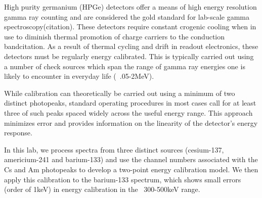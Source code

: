 High purity germanium (HPGe) detectors offer a means of high energy resolution gamma
ray counting and are considered the gold standard for lab-scale gamma
spectroscopy(citation). These detectors require constant crogenic cooling when in use to
diminish thermal promotion of charge carriers to the conduction band{citation}. As a
result of thermal cycling and drift in readout electronics, these detectors must
be regularly energy calibrated. This is typically carried out using a number of
check sources which span the range of gamma ray energies one is likely to encounter
in everyday life (~.05-2MeV). \par
While calibration can theoretically be carried out using a minimum of two distinct
photopeaks, standard operating procedures in most cases call for at least three
of such peaks spaced widely across the useful energy range. This approach minimizes
error and provides information on the linearity of the detector's energy response. \par
In this lab, we process spectra from three distinct sources (cesium-137, americium-241
and barium-133) and use the channel numbers associated with the Cs and Am photopeaks
to develop a two-point energy calibration model. We then apply this calibration to the
barium-133 spectrum, which shows small errors (order of 1keV) in energy calibration in the
~300-500keV range. 
